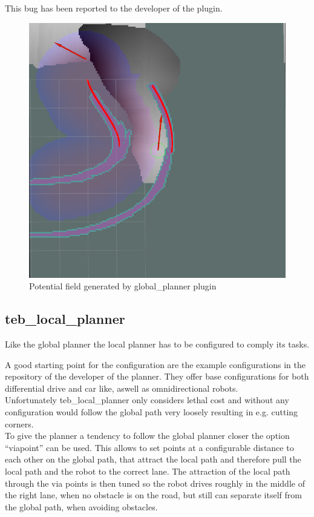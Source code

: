  This bug has been reported to the developer of the plugin.
 
 \begin{figure}[H]
 	\centering
 	\includegraphics[width=.7\textwidth]{Pictures/out of bounds}	
 	
 	\caption{Potential field generated by global\_planner plugin}
 	\label{potentialfield}
 \end{figure}


\subsection{teb\_local\_planner}

Like the global planner the local planner has to be configured to comply its tasks.

A good starting point for the configuration are the example configurations in the repository of the developer of the planner\cite{tebtutorials}. They offer base configurations for both differential drive and car like, aswell as omnidirectional robots.\\

Unfortunately teb\_local\_planner only considers lethal cost and without any configuration would follow the global path very loosely resulting in e.g. cutting corners.\\ 

To give the planner a tendency to follow the global planner closer the option ``viapoint'' can be used. This allows to set points at a configurable distance to each other on the global path, that attract the local path and therefore pull the local path and the robot to the correct lane. The attraction of the local path through the via points is then tuned so the robot drives roughly in the middle of the right lane, when no obstacle is on the road, but still can separate itself from the global path, when avoiding obstacles.\\

